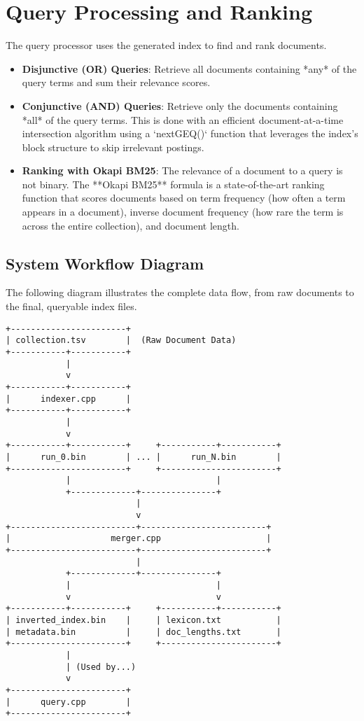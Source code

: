 \documentclass[11pt, a4paper]{report}
\begin{document}
\section{Query Processing and Ranking}
The query processor uses the generated index to find and rank documents.
\begin{itemize}
    \item \textbf{Disjunctive (OR) Queries}: Retrieve all documents containing *any* of the query terms and sum their relevance scores.
    \item \textbf{Conjunctive (AND) Queries}: Retrieve only the documents containing *all* of the query terms. This is done with an efficient document-at-a-time intersection algorithm using a `nextGEQ()` function that leverages the index's block structure to skip irrelevant postings.
    \item \textbf{Ranking with Okapi BM25}: The relevance of a document to a query is not binary. The **Okapi BM25** formula is a state-of-the-art ranking function that scores documents based on term frequency (how often a term appears in a document), inverse document frequency (how rare the term is across the entire collection), and document length.
\end{itemize}

\subsection{System Workflow Diagram}
The following diagram illustrates the complete data flow, from raw documents to the final, queryable index files.
\begin{verbatim}
+-----------------------+
| collection.tsv        |  (Raw Document Data)
+-----------+-----------+
            |
            v
+-----------+-----------+
|      indexer.cpp      |
+-----------+-----------+
            |
            v
+-----------+-----------+     +-----------+-----------+
|      run_0.bin        | ... |      run_N.bin        |
+-----------------------+     +-----------------------+
            |                             |
            +-------------+---------------+
                          |
                          v
+-------------------------+-------------------------+
|                    merger.cpp                     |
+-------------------------+-------------------------+
                          |
            +-------------+---------------+
            |                             |
            v                             v
+-----------+-----------+     +-----------+-----------+
| inverted_index.bin    |     | lexicon.txt           |
| metadata.bin          |     | doc_lengths.txt       |
+-----------------------+     +-----------------------+
            |
            | (Used by...)
            v
+-----------------------+
|      query.cpp        |
+-----------------------+
\end{verbatim}
\end{document}
